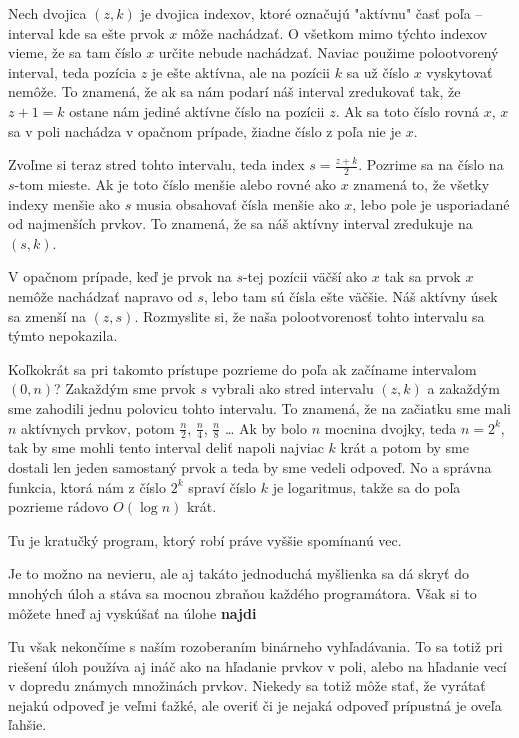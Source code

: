 Nech dvojica $(z, k)$ je dvojica indexov, ktoré označujú "aktívnu" časť poľa -- interval kde sa ešte
prvok $x$ môže nachádzať. O všetkom mimo týchto indexov vieme, že sa tam číslo $x$ určite nebude
nachádzať. Naviac použime polootvorený interval, teda pozícia $z$ je ešte aktívna, ale na pozícii
$k$ sa už číslo $x$ vyskytovať nemôže. To znamená, že ak sa nám podarí náš interval zredukovať tak,
že $z+1 = k$ ostane nám jediné aktívne číslo na pozícii $z$. Ak sa toto číslo rovná $x$, $x$ sa v
poli nachádza v opačnom prípade, žiadne číslo z poľa nie je $x$.

Zvoľme si teraz stred tohto intervalu, teda index $s = \frac{z+k}{2}$. Pozrime sa na číslo na
$s$-tom mieste. Ak je toto číslo menšie alebo rovné ako $x$ znamená to, že všetky indexy menšie ako
$s$ musia obsahovať čísla menšie ako $x$, lebo pole je usporiadané od najmenších prvkov. To znamená,
že sa náš aktívny interval zredukuje na $(s, k)$.

V opačnom prípade, keď je prvok na $s$-tej pozícii väčší ako $x$ tak sa prvok $x$ nemôže nachádzať
napravo od $s$, lebo tam sú čísla ešte väčšie. Náš aktívny úsek sa zmenší na $(z, s)$. Rozmyslite
si, že naša polootvorenosť tohto intervalu sa týmto nepokazila.

Koľkokrát sa pri takomto prístupe pozrieme do poľa ak začíname intervalom $(0, n)$? Zakaždým sme prvok $s$ vybrali ako stred
intervalu $(z, k)$ a zakaždým sme zahodili jednu polovicu tohto intervalu. To znamená, že na
začiatku sme mali $n$ aktívnych prvkov, potom $\frac{n}{2}$, $\frac{n}{4}$, $\frac{n}{8}$ \dots
Ak by bolo $n$ mocnina dvojky, teda $n = 2^k$, tak by sme mohli tento interval deliť napoli najviac
$k$ krát a potom by sme dostali len jeden samostaný prvok a teda by sme vedeli odpoveď. No a správna
funkcia, ktorá nám z číslo $2^k$ spraví číslo $k$ je logaritmus, takže sa do poľa pozrieme rádovo
$O(\log n)$ krát.

Tu je kratučký program, ktorý robí práve vyššie spomínanú vec.


Je to možno na nevieru, ale aj takáto jednoduchá myšlienka sa dá skryť do mnohých úloh a stáva sa
mocnou zbraňou každého programátora. Však si to môžete hneď aj vyskúšať na úlohe \textbf{najdi}


Tu však nekončíme s naším rozoberaním binárneho vyhľadávania. To sa totiž pri riešení úloh používa
aj ináč ako na hľadanie prvkov v poli, alebo na hľadanie vecí v dopredu známych množinách prvkov.
Niekedy sa totiž môže stať, že vyrátať nejakú odpoveď je veľmi ťažké, ale overiť či je nejaká
odpoveď prípustná je oveľa ľahšie.

